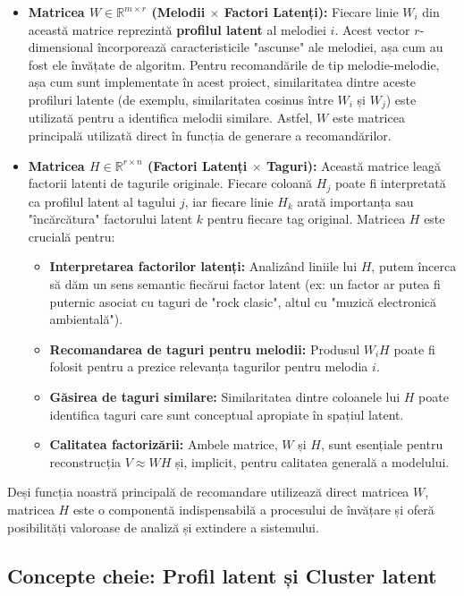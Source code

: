 \documentclass[12pt,a4paper]{article}
\begin{document}
	\begin{itemize}
		\item \textbf{Matricea $W \in \mathbb{R}^{m \times r}$ (Melodii $\times$ Factori Latenți):} Fiecare linie $W_i$ din această matrice reprezintă \textbf{profilul latent} al melodiei $i$. Acest vector $r$-dimensional încorporează caracteristicile "ascunse" ale melodiei, așa cum au fost ele învățate de algoritm. Pentru recomandările de tip melodie-melodie, așa cum sunt implementate în acest proiect, similaritatea dintre aceste profiluri latente (de exemplu, similaritatea cosinus între $W_i$ și $W_j$) este utilizată pentru a identifica melodii similare. Astfel, $W$ este matricea principală utilizată direct în funcția de generare a recomandărilor.
		
		\item \textbf{Matricea $H \in \mathbb{R}^{r \times n}$ (Factori Latenți $\times$ Taguri):} Această matrice leagă factorii latenti de tagurile originale. Fiecare coloană $H_j$ poate fi interpretată ca profilul latent al tagului $j$, iar fiecare linie $H_k$ arată importanța sau "încărcătura" factorului latent $k$ pentru fiecare tag original. Matricea $H$ este crucială pentru:
		\begin{itemize}
			\item \textbf{Interpretarea factorilor latenți:} Analizând liniile lui $H$, putem încerca să dăm un sens semantic fiecărui factor latent (ex: un factor ar putea fi puternic asociat cu taguri de "rock clasic", altul cu "muzică electronică ambientală").
			\item \textbf{Recomandarea de taguri pentru melodii:} Produsul $W_i H$ poate fi folosit pentru a prezice relevanța tagurilor pentru melodia $i$.
			\item \textbf{Găsirea de taguri similare:} Similaritatea dintre coloanele lui $H$ poate identifica taguri care sunt conceptual apropiate în spațiul latent.
			\item \textbf{Calitatea factorizării:} Ambele matrice, $W$ și $H$, sunt esențiale pentru reconstrucția $V \approx WH$ și, implicit, pentru calitatea generală a modelului.
		\end{itemize}
	\end{itemize}
	Deși funcția noastră principală de recomandare utilizează direct matricea $W$, matricea $H$ este o componentă indispensabilă a procesului de învățare și oferă posibilități valoroase de analiză și extindere a sistemului.
	
	\subsection*{Concepte cheie: Profil latent și Cluster latent}
	
\end{document}
